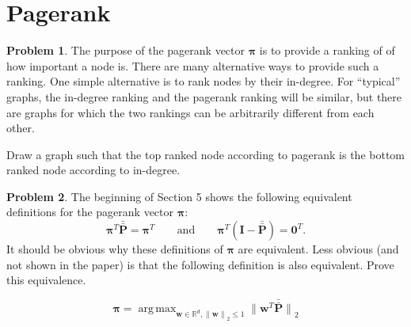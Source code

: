 \documentclass[10pt]{article}
\theoremstyle{definition}
\newtheorem{problem}{Problem}
\newcommand{\R}{\mathbb R}
\DeclareMathOperator*{\argmax}{arg\,max}
\newcommand{\I}{\mathbf I}
\newcommand{\p}{\mathbf P}
\newcommand{\pb}{\bar {\p}}
\newcommand{\pbb}{\bar {\pb}}
\newcommand{\pr}{\bm \pi}
\newcommand{\trans}[1]{{#1}^{T}}
\newcommand{\w}{\mathbf w}
\newcommand{\ltwo}[1]{{\lVert {#1} \rVert}_2}
\begin{document}

\newpage
\section{Pagerank}


\begin{problem}
    The purpose of the pagerank vector $\pr$ is to provide a ranking of of how important a node is.
    There are many alternative ways to provide such a ranking.
    One simple alternative is to rank nodes by their in-degree.
    For ``typical'' graphs, the in-degree ranking and the pagerank ranking will be similar,
    but there are graphs for which the two rankings can be arbitrarily different from each other.

    Draw a graph such that the top ranked node according to pagerank is the bottom ranked node according to in-degree.
\end{problem}


\clearpage
\begin{problem}
    The beginning of Section 5 shows the following equivalent definitions for the pagerank vector $\pr$:
    \begin{equation}
        \trans \pr \pbb = \trans \pr
        \qquad
        \text{and}
        \qquad
        \trans \pr (\I - \pbb) = \trans{\bm 0}
        .
    \end{equation}
    It should be obvious why these definitions of $\pr$ are equivalent. 
    Less obvious (and not shown in the paper) is that
    the following definition is also equivalent.
    Prove this equivalence.

    \begin{equation}
        \pr = \argmax_{\w \in \R^d, \ltwo{\w} \le 1} \ltwo{\trans \w \pbb}
    \end{equation}
\end{problem}


\newpage
\end{document}
